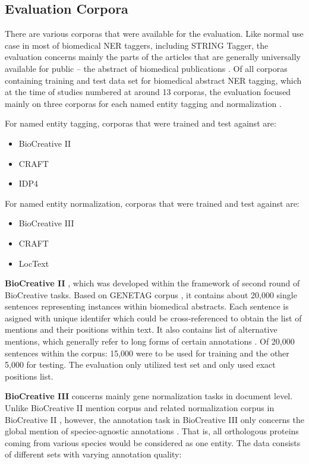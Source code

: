 \subsection{Evaluation Corpora}

There are various corporas that were available for the evaluation. Like normal use case in most of biomedical NER taggers, including STRING Tagger, the evaluation concerns mainly the parts of the articles that are generally universally available for public -- the abstract of biomedical publications \citep{ofner2015evaluation} \citep{nenadic2005mining}. Of all corporas containing training and test data set for biomedical abstract NER tagging, which at the time of studies numbered at around 13 corporas, the evaluation focused mainly on three corporas for each named entity tagging and normalization \citep{ofner2015evaluation}.


For named entity tagging, corporas that were trained and test against are: 

\begin{itemize}
\item BioCreative II
\item CRAFT
\item IDP4
\end{itemize}
 
For named entity normalization, corporas that were trained and test against are:

\begin{itemize}
\item BioCreative III
\item CRAFT
\item LocText
\end{itemize}


\textbf{BioCreative II} \citep{smith2008overview}, which was developed within the framework of second round of BioCreative tasks\citep{hirschman2005overview}. Based on GENETAG corpus \citep{tanabe2005genetag}, it contains about 20,000 single sentences representing instances within biomedical abstracts. Each sentence is asigned with unique identifer which could be cross-referenced to obtain the list of mentions and their positions within text. It also contains list of alternative mentions, which generally refer to long forms of certain annotations \citep{ofner2015evaluation}. Of 20,000 sentences within the corpus: 15,000 were to be used for training and the other 5,000 for testing. The evaluation only utilized test set and only used exact positions list.

\textbf{BioCreative III} \citep{lu2011gene} concerns mainly gene normalization tasks in document level. Unlike BioCreative II mention corpus and related normalization corpus in BioCreative II \citep{morgan2008overview}, however, the annotation task in BioCreative III only concerns the global mention of speciec-agnostic annotations . That is, all orthologous proteins coming from various species would be considered as one entity. The data consists of different sets with varying annotation quality:


